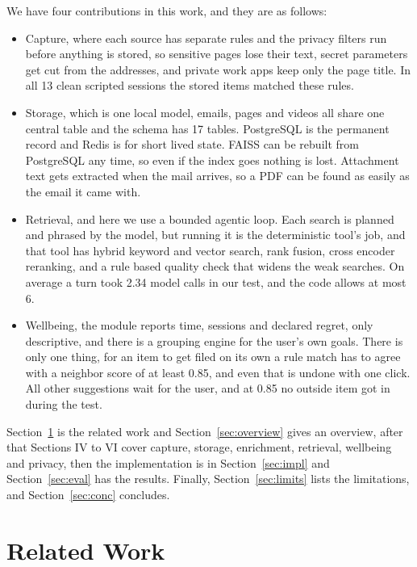 \documentclass[conference]{IEEEtran}
\begin{document}
We have four contributions in this work, and they are as follows:
\begin{itemize}
\item Capture, where each source has separate rules and the privacy filters run before anything is stored, so sensitive pages lose their text, secret parameters get cut from the addresses, and private work apps keep only the page title. In all 13 clean scripted sessions the stored items matched these rules.
\item Storage, which is one local model, emails, pages and videos all share one central table and the schema has 17 tables. PostgreSQL is the permanent record and Redis is for short lived state. FAISS can be rebuilt from PostgreSQL any time, so even if the index goes nothing is lost. Attachment text gets extracted when the mail arrives, so a PDF can be found as easily as the email it came with.
\item Retrieval, and here we use a bounded agentic loop. Each search is planned and phrased by the model, but running it is the deterministic tool's job, and that tool has hybrid keyword and vector search, rank fusion, cross encoder reranking, and a rule based quality check that widens the weak searches. On average a turn took 2.34 model calls in our test, and the code allows at most 6.
\item Wellbeing, the module reports time, sessions and declared regret, only descriptive, and there is a grouping engine for the user's own goals. There is only one thing, for an item to get filed on its own a rule match has to agree with a neighbor score of at least 0.85, and even that is undone with one click. All other suggestions wait for the user, and at 0.85 no outside item got in during the test.
\end{itemize}

Section~\ref{sec:related} is the related work and Section~\ref{sec:overview} gives an overview, after that Sections IV to VI cover capture, storage, enrichment, retrieval, wellbeing and privacy, then the implementation is in Section~\ref{sec:impl} and Section~\ref{sec:eval} has the results. Finally, Section~\ref{sec:limits} lists the limitations, and Section~\ref{sec:conc} concludes.

\section{Related Work}\label{sec:related}
\end{document}

